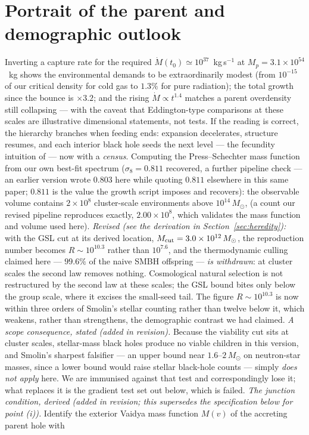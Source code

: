 \documentclass[11pt]{article}
\begin{document}
\section{Portrait of the parent and demographic outlook}\label{sec:smolin-scope}
Inverting a capture rate for the required $\dot M(t_0) \simeq 10^{37}$~kg\,s$^{-1}$ at $M_p = 3.1\times10^{54}$~kg shows the environmental demands to be extraordinarily modest (from $10^{-15}$ of our critical density for cold gas to $1.3\%$ for pure radiation); the total growth since the bounce is $\times 3.2$; and the rising $\dot M \propto t^{1.4}$ matches a parent overdensity still collapsing --- with the caveat that Eddington-type comparisons at these scales are illustrative dimensional statements, not tests. If the reading is correct, the hierarchy branches when feeding ends: expansion decelerates, structure resumes, and each interior black hole seeds the next level --- the fecundity intuition of \cite{Smolin1997} --- now with a \emph{census}. Computing the Press--Schechter mass function \cite{PS74} from our own best-fit spectrum ($\sigma_8 = 0.811$ recovered, a further pipeline check --- an earlier version wrote $0.803$ here while quoting $0.811$ elsewhere in this same paper; $0.811$ is the value the growth script imposes and recovers): the observable volume contains $2\times10^{8}$ cluster-scale environments above $10^{14}\,M_\odot$, (a count our revised pipeline reproduces exactly, $2.00\times10^{8}$, which validates the mass function and volume used here). \emph{Revised (see the derivation in Section~\ref{sec:heredity}):} with the GSL cut at its derived location, $M_{\rm cut} = 3.0\times10^{12}\,M_\odot$, the reproduction number becomes $R \sim 10^{10.3}$ rather than $10^{7.6}$, and the thermodynamic culling claimed here --- $99.6\%$ of the naive SMBH offspring --- \emph{is withdrawn}: at cluster scales the second law removes nothing. Cosmological natural selection is not restructured by the second law at these scales; the GSL bound bites only below the group scale, where it excises the small-seed tail. The figure $R \sim 10^{10.3}$ is now within three orders of Smolin's stellar counting rather than twelve below it, which weakens, rather than strengthens, the demographic contrast we had claimed. \emph{A scope consequence, stated (added in revision).} Because the viability cut sits at cluster scales, stellar-mass black holes produce no viable children in this version, and Smolin's sharpest falsifier --- an upper bound near $1.6$--$2\,M_\odot$ on neutron-star masses, since a lower bound would raise stellar black-hole counts \cite{Smolin2006} --- simply \emph{does not apply} here. We are immunised against that test and correspondingly lose it; what replaces it is the gradient test set out below, which is failed. \emph{The junction condition, derived (added in revision; this supersedes the specification below
for point (i)).} Identify the exterior Vaidya mass function $M(v)$ of the accreting parent hole with
\end{document}
